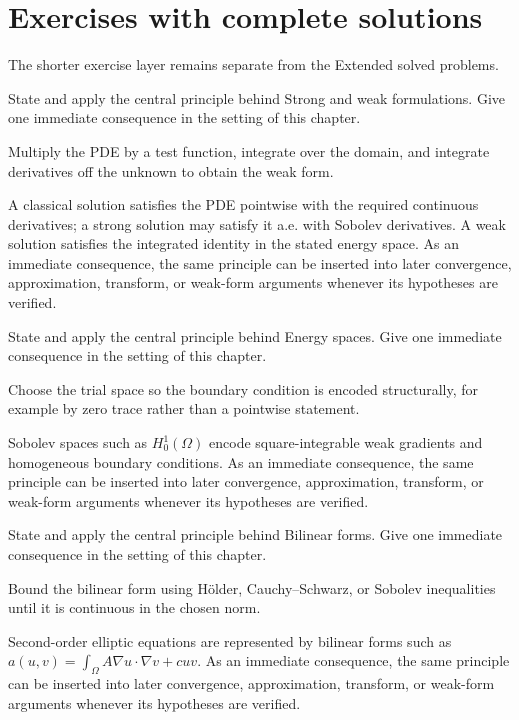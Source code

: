 \section{Exercises with complete solutions}
The shorter exercise layer remains separate from the Extended solved problems.

\begin{exercise}\label{exr:iii23-01}
State and apply the central principle behind Strong and weak formulations. Give one immediate consequence in the setting of this chapter.
\end{exercise}
\begin{hint}
Multiply the PDE by a test function, integrate over the domain, and integrate derivatives off the unknown to obtain the weak form.
\end{hint}
\begin{solution}
A classical solution satisfies the PDE pointwise with the required continuous derivatives; a strong solution may satisfy it a.e. with Sobolev derivatives. A weak solution satisfies the integrated identity in the stated energy space. As an immediate consequence, the same principle can be inserted into later convergence, approximation, transform, or weak-form arguments whenever its hypotheses are verified.
\end{solution}

\begin{exercise}\label{exr:iii23-02}
State and apply the central principle behind Energy spaces. Give one immediate consequence in the setting of this chapter.
\end{exercise}
\begin{hint}
Choose the trial space so the boundary condition is encoded structurally, for example by zero trace rather than a pointwise statement.
\end{hint}
\begin{solution}
Sobolev spaces such as $H_0^1(\Omega)$ encode square-integrable weak gradients and homogeneous boundary conditions. As an immediate consequence, the same principle can be inserted into later convergence, approximation, transform, or weak-form arguments whenever its hypotheses are verified.
\end{solution}

\begin{exercise}\label{exr:iii23-03}
State and apply the central principle behind Bilinear forms. Give one immediate consequence in the setting of this chapter.
\end{exercise}
\begin{hint}
Bound the bilinear form using Hölder, Cauchy--Schwarz, or Sobolev inequalities until it is continuous in the chosen norm.
\end{hint}
\begin{solution}
Second-order elliptic equations are represented by bilinear forms such as $a(u,v)=\int_\Omega A\nabla u\cdot\nabla v+cuv$. As an immediate consequence, the same principle can be inserted into later convergence, approximation, transform, or weak-form arguments whenever its hypotheses are verified.
\end{solution}

